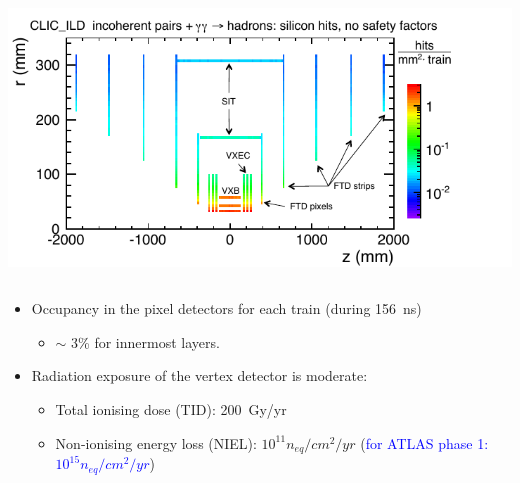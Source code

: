 \begin{frame}
\begin{columns}
    \includegraphics[width=\textwidth]{figures/background_vertex.pdf}
  \end{columns}

  \begin{itemize}
  \item Occupancy in the pixel detectors for each train (during
    \SI{156}{\nano\second})
    \begin{itemize}
    \item $\sim$ 3\% for innermost layers.
    \end{itemize} \vspace{0.2cm}
  \item Radiation exposure of the vertex detector is moderate:
    \begin{itemize}
    \item Total ionising dose (TID): 200~Gy/yr
    \item Non-ionising energy loss (NIEL): $10^{11} n_{eq}/cm^{2}/yr$ (\textcolor{blue}{for ATLAS phase 1: $10^{15} n_{eq}/cm^{2}/yr$})
    \end{itemize}
  \end{itemize}

\end{frame}